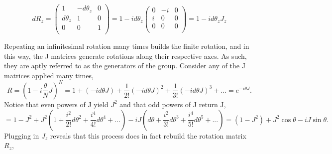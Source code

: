 \documentclass[12pt]{article}
\begin{document}
\begin{equation}
dR_z = 
\begin{pmatrix}
1 & -d\theta_z & 0 \\
d\theta_z & 1 & 0 \\
0 & 0 & 1 \\
\end{pmatrix}
= 1 - id\theta_z 
\begin{pmatrix}
0 & -i & 0 \\
i & 0 & 0 \\
0 & 0 & 0 \\
\end{pmatrix}
= 1 - id\theta_z J_z
\end{equation}

Repeating an infinitesimal rotation many times builds the finite rotation, and in this way, the J matrices generate rotations along their respective axes.  As such, they are aptly referred to as the generators of the group. Consider any of the J matrices applied many times,
\begin{equation}
R = (1 - i\frac{\theta}{N} J)^{N} = 1 + (-id\theta J) + \frac{1}{2!}(-id\theta J)^2 + \frac{1}{3!}(-id\theta J)^3 + ... = e^{-i\theta J}. 
\end{equation}
Notice that even powers of J yield $J^2$ and that odd powers of J return J,
\begin{equation}
  = 1 - J^2 + J^2(1 + \frac{i^2}{2!} d\theta^2 + \frac{i^4}{4!} d\theta^4 + ...) - iJ(d\theta + \frac{i^2}{3!}d\theta^3 + \frac{i^4}{5!}d\theta^5 + ...) 
  = (1-J^2) + J^2 \cos\theta - iJ\sin\theta.
\end{equation}
Plugging in $J_z$ reveals that this process does in fact rebuild the rotation matrix $R_z$,
\end{document}
